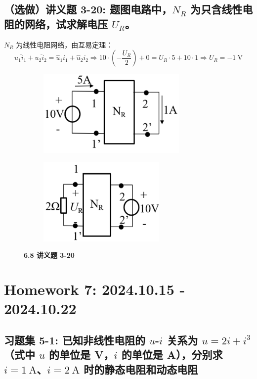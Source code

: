 \documentclass[UTF8]{report}
\theoremstyle{MyLineTheoremStyle} %
\theoremstyle{MyBlockTheoremStyle} %
\theoremstyle{MySubsubsectionStyle} %
\begin{document}
\section{（选做）讲义题 3-20: 题图电路中，$N_R$ 为只含线性电阻的网络，试求解电压 $U_R$。}

$N_R$ 为线性电阻网络，由互易定理：
\begin{equation}
    u_1\hat{i}_1 + u_2 \hat{i}_2 = \hat{u}_1i_1 + \hat{u}_2 i_2 \Longrightarrow 
    10\cdot \left(- \frac{U_R}{2}\right) + 0 = U_R\cdot 5 + 10 \cdot 1 \Longrightarrow \boxed{
        U_R = -1 \ \mathrm{V}
    }
\end{equation}


\begin{figure}[H]\centering
\begin{subfigure}[t]{0.5\columnwidth}\centering
    \includegraphics[height=120pt]{assets/6/940731df99ca203c28371281cebfb9ca.png}
\end{subfigure}\hfill
\begin{subfigure}[t]{0.5\columnwidth}\centering
    \includegraphics[height=120pt]{assets/6/7c27b6b5231748eb023412fd0cbe700c.png}
\end{subfigure}
\caption{\bfseries 6.8 讲义题 3-20 }
\end{figure}


\chapter{Homework 7: 2024.10.15 - 2024.10.22}\thispagestyle{fancy}

\section{习题集 5-1: 已知非线性电阻的 $u$-$i$ 关系为 $u = 2i + i^3$（式中 $u$ 的单位是 V，$i$ 的单位是 A），分别求 $i = 1 \ \mathrm{A}$、$i = 2 \ \mathrm{A}$ 时的静态电阻和动态电阻}
\end{document}
